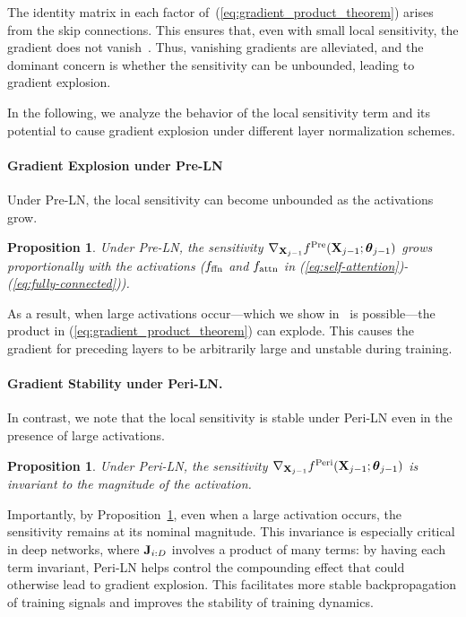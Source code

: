 \documentclass[journal]{IEEEtran}
\def\eqref#1{equation~\ref{#1}}
\newcommand{\bfJ}{{\bf J}}
\newcommand{\bfX}{{\bf X}}
\newcommand{\bftheta}{{\boldsymbol \theta}}
\renewcommand{\eqref}[1]{(\ref{#1})}
\theoremstyle{plain}
\newtheorem{proposition}[theorem]{Proposition}
\theoremstyle{definition}
\theoremstyle{remark}
\begin{document}
The identity matrix in each factor of~\eqref{eq:gradient_product_theorem} arises from the skip connections. This ensures that, even with small local sensitivity, the gradient does not vanish~\cite{he2016deep}. Thus, vanishing gradients are alleviated, and the dominant concern is whether the sensitivity can be unbounded, leading to gradient explosion.

In the following, we analyze the behavior of the local sensitivity term and its potential to cause gradient explosion under different layer normalization schemes.

\paragraph{Gradient Explosion under Pre-LN} Under Pre-LN, the local sensitivity can become unbounded as the activations grow.

\begin{proposition}\label{thm:gradient_explosion}
Under Pre-LN, the sensitivity $\nabla_{\bfX_{j-1}} f^{\rm Pre}(\bfX_{j-1}; \bftheta_{j-1})$ grows proportionally with the activations ($f_{\rm ffn}$ and $f_{\rm attn}$ in (\ref{eq:self-attention})-(\ref{eq:fully-connected})). 
\end{proposition}
As a result, when large activations occur---which we show in~ is possible---the product in \eqref{eq:gradient_product_theorem} can explode. This causes the gradient for preceding layers to be arbitrarily large and unstable during training.

\paragraph{Gradient Stability under Peri-LN.}
In contrast, we note that the local sensitivity is stable under Peri-LN even in the presence of large activations.

\begin{proposition}\label{thm:gradient_stability}
 Under Peri-LN, the sensitivity $\nabla_{\bfX_{j-1}} f^{\rm Peri}(\bfX_{j-1}; \bftheta_{j-1})$ is \textit{invariant} to the magnitude of the activation. 
\end{proposition}

Importantly, by Proposition~\ref{thm:gradient_stability}, even when a large activation occurs, the sensitivity remains at its nominal magnitude. This invariance is especially critical in deep networks, where $\bfJ_{i:D}$ involves a product of many terms: by having each term invariant, Peri-LN helps control the compounding effect that could otherwise lead to gradient explosion. This facilitates more stable backpropagation of training signals and improves the stability of training dynamics.
\end{document}
